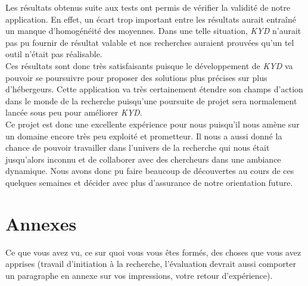 \documentclass[10pt]{article}
\begin{document}
Les résultats obtenus suite aux tests ont permis de vérifier la validité de
notre application. En effet, un écart trop important entre les résultats aurait
entraîné un manque d'homogénéité des moyennes. Dans une telle situation,
\textit{KYD} n'aurait pas pu fournir de résultat valable et nos recherches
auraient prouvées qu'un tel outil n'était pas réalisable.\\


Ces résultats sont donc très satisfaisants puisque le développement de
\textit{KYD} va pouvoir se poursuivre pour proposer des solutions plus précises
sur plus d'hébergeurs. Cette application va très certainement étendre son
champs d'action dans le monde de la recherche puisqu'une poursuite de projet
sera normalement lancée sous peu pour améliorer \textit{KYD}.\\

Ce projet est donc une excellente expérience pour nous puisqu'il nous amène sur
un domaine encore très peu exploité et prometteur. Il nous a aussi donné la
chance de pouvoir travailler dans l'univers de la recherche qui nous était
jusqu'alors inconnu et de collaborer avec des chercheurs dans une ambiance
dynamique. Nous avons donc pu faire beaucoup de découvertes au cours de ces
quelques semaines et décider avec plus d'assurance de notre orientation
future.\\


\section{Annexes}

Ce que vous avez vu, ce sur quoi vous vous êtes formés, des choses que vous
avez apprises (travail d'initiation à la recherche, l'évaluation devrait aussi
comporter un paragraphe en annexe sur vos impressions, votre retour
d'expérience).



\end{document}

